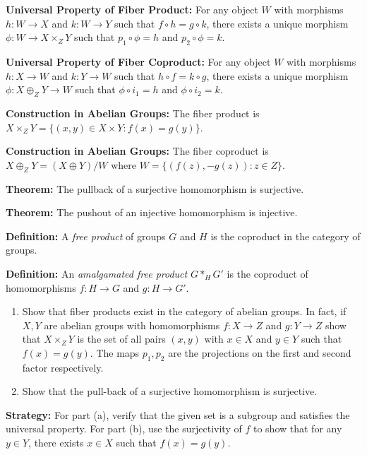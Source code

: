 \textbf{Universal Property of Fiber Product:} For any object $W$ with morphisms $h: W \to X$ and $k: W \to Y$ such that $f \circ h = g \circ k$, there exists a unique morphism $\phi: W \to X \times_Z Y$ such that $p_1 \circ \phi = h$ and $p_2 \circ \phi = k$.

\textbf{Universal Property of Fiber Coproduct:} For any object $W$ with morphisms $h: X \to W$ and $k: Y \to W$ such that $h \circ f = k \circ g$, there exists a unique morphism $\phi: X \oplus_Z Y \to W$ such that $\phi \circ i_1 = h$ and $\phi \circ i_2 = k$.

\textbf{Construction in Abelian Groups:} The fiber product is $X \times_Z Y = \{(x,y) \in X \times Y : f(x) = g(y)\}$.

\textbf{Construction in Abelian Groups:} The fiber coproduct is $X \oplus_Z Y = (X \oplus Y)/W$ where $W = \{(f(z), -g(z)) : z \in Z\}$.

\textbf{Theorem:} The pullback of a surjective homomorphism is surjective.

\textbf{Theorem:} The pushout of an injective homomorphism is injective.

\textbf{Definition:} A \textit{free product} of groups $G$ and $H$ is the coproduct in the category of groups.

\textbf{Definition:} An \textit{amalgamated free product} $G *_H G'$ is the coproduct of homomorphisms $f: H \to G$ and $g: H \to G'$.

\begin{problembox}
\begin{enumerate}[label=(\alph*)]
\item Show that fiber products exist in the category of abelian groups. In fact, if $X, Y$ are abelian groups with homomorphisms $f: X \rightarrow Z$ and $g: Y \rightarrow Z$ show that $X \times_Z Y$ is the set of all pairs $(x, y)$ with $x \in X$ and $y \in Y$ such that $f(x) = g(y)$. The maps $p_1, p_2$ are the projections on the first and second factor respectively.
\item Show that the pull-back of a surjective homomorphism is surjective.
\end{enumerate}
\end{problembox}

\noindent\textbf{Strategy:} For part (a), verify that the given set is a subgroup and satisfies the universal property. For part (b), use the surjectivity of $f$ to show that for any $y \in Y$, there exists $x \in X$ such that $f(x) = g(y)$.

